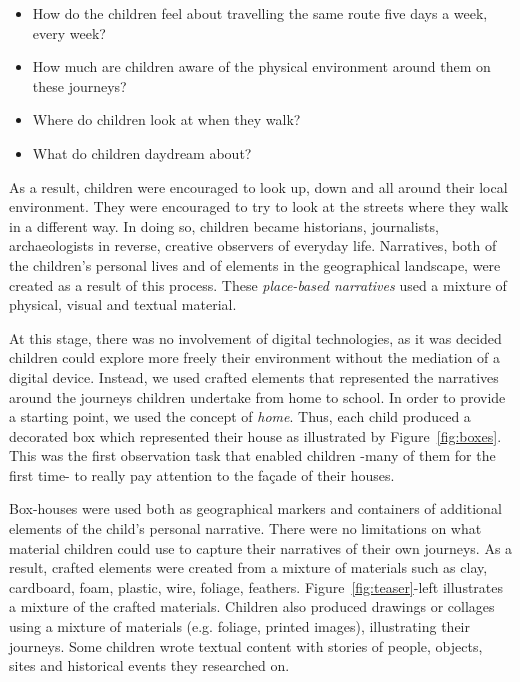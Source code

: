 \documentclass[acmlarge,screen,dvipsnames]{acmart}
\begin{document}
\begin{itemize} 
  \item How do the children feel about travelling the same route five days a week, every week?   
  \item How much are children aware of the physical environment around them on these journeys? 
  \item Where do children look at when they walk? 
  \item What do children daydream about? 
\end{itemize}

As a result, children were encouraged to look up, down and all around their
local environment. They were encouraged to try to look at the streets where
they walk in a different way. In doing so, children became historians,
journalists, archaeologists in reverse, creative observers of everyday life.
Narratives, both of the children's personal lives and of elements in the
geographical landscape, were created as a result of this process. These
\emph{place-based narratives} used a mixture of physical, visual and textual
material. 

At this stage, there was no involvement of digital technologies, as it was
decided children could explore more freely their environment without the
mediation of a digital device. Instead, we used crafted elements that represented 
the narratives around the journeys children undertake from home to school. 
In order to provide a starting point, we used the concept of \emph{home}. Thus, each child produced a decorated box
which represented their house as illustrated by Figure~\ref{fig:boxes}. This
was the first observation task that enabled children -many of them for the first time-
to really pay attention to the fa\c{c}ade of their houses. 


Box-houses were used both
as geographical markers and containers of additional elements of the child's personal narrative. 
There were no
limitations on what material children could use to capture their narratives of their own journeys.
As a result, crafted elements were created from a mixture of materials such as
clay, cardboard, foam, plastic, wire, foliage, feathers.
Figure~\ref{fig:teaser}-left illustrates a mixture of the crafted materials. Children also produced drawings or collages using a
mixture of materials (e.g. foliage, printed images), illustrating their
journeys. Some children wrote
textual content with stories of people, objects, sites and historical events they
researched on.
\end{document}
